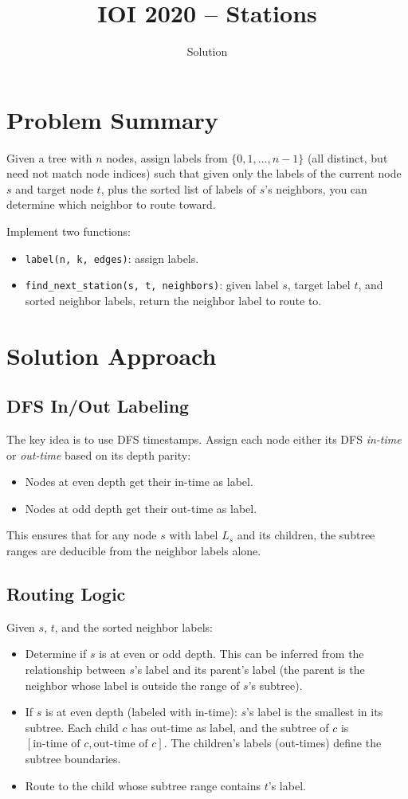 \documentclass[11pt,a4paper]{article}
\title{IOI 2020 -- Stations}
\author{Solution}
\date{}
\begin{document}
\maketitle

\section{Problem Summary}
Given a tree with $n$ nodes, assign labels from $\{0, 1, \ldots, n-1\}$ (all distinct, but need not match node indices) such that given only the labels of the current node $s$ and target node $t$, plus the sorted list of labels of $s$'s neighbors, you can determine which neighbor to route toward.

Implement two functions:
\begin{itemize}
  \item \texttt{label(n, k, edges)}: assign labels.
  \item \texttt{find\_next\_station(s, t, neighbors)}: given label $s$, target label $t$, and sorted neighbor labels, return the neighbor label to route to.
\end{itemize}

\section{Solution Approach}

\subsection{DFS In/Out Labeling}
The key idea is to use DFS timestamps. Assign each node either its DFS \emph{in-time} or \emph{out-time} based on its depth parity:
\begin{itemize}
  \item Nodes at even depth get their in-time as label.
  \item Nodes at odd depth get their out-time as label.
\end{itemize}

This ensures that for any node $s$ with label $L_s$ and its children, the subtree ranges are deducible from the neighbor labels alone.

\subsection{Routing Logic}
Given $s$, $t$, and the sorted neighbor labels:
\begin{itemize}
  \item Determine if $s$ is at even or odd depth. This can be inferred from the relationship between $s$'s label and its parent's label (the parent is the neighbor whose label is outside the range of $s$'s subtree).
  \item If $s$ is at even depth (labeled with in-time): $s$'s label is the smallest in its subtree. Each child $c$ has out-time as label, and the subtree of $c$ is $[\text{in-time of } c, \text{out-time of } c]$. The children's labels (out-times) define the subtree boundaries.
  \item Route to the child whose subtree range contains $t$'s label.
\end{itemize}
\end{document}
